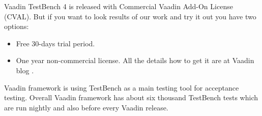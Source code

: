 Vaadin TestBench 4 is released with Commercial Vaadin Add-On License 
(CVAL). But if you want to look results of our work and try it out you have two
options:
\begin{itemize}
  \item Free 30-days trial period.
  \item One year non-commercial license. All the details how to get it are at
  Vaadin blog \cite{vaadinBlog}.
\end{itemize}

Vaadin framework is using TestBench as a main testing tool for acceptance
testing. Overall Vaadin framework has about six thousand TestBench tests which
are run nightly and also before every Vaadin release.
